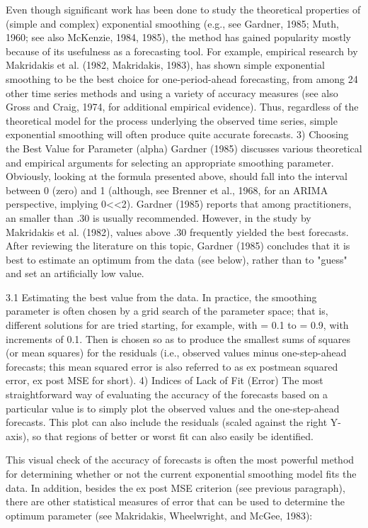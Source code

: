 Even though significant work has been done to study the theoretical properties of (simple and complex) exponential smoothing (e.g., see Gardner, 1985; Muth, 1960; see also McKenzie, 1984, 1985), the method has gained popularity mostly because of its usefulness as a forecasting tool. For example, empirical research by Makridakis et al. (1982, Makridakis, 1983), has shown simple exponential smoothing to be the best choice for one-period-ahead forecasting, from among 24 other time series methods and using a variety of accuracy measures (see also Gross and Craig, 1974, for additional empirical evidence). Thus, regardless of the theoretical model for the process underlying the observed time series, simple exponential smoothing will often produce quite accurate forecasts.
3) Choosing the Best Value for Parameter   (alpha)
Gardner (1985) discusses various theoretical and empirical arguments for selecting an appropriate smoothing parameter. Obviously, looking at the formula presented above,  should fall into the interval between 0 (zero) and 1 (although, see Brenner et al., 1968, for an ARIMA perspective, implying 0<<2). Gardner (1985) reports that among practitioners, an  smaller than .30 is usually recommended. However, in the study by Makridakis et al. (1982),  values above .30 frequently yielded the best forecasts. After reviewing the literature on this topic, Gardner (1985) concludes that it is best to estimate an optimum  from the data (see below), rather than to "guess" and set an artificially low value.

3.1 Estimating the best  value from the data. In practice, the smoothing parameter is often chosen by a grid search of the parameter space; that is, different solutions for  are tried starting, for example, with  = 0.1 to = 0.9, with increments of 0.1. Then  is chosen so as to produce the smallest sums of squares (or mean squares) for the residuals (i.e., observed values minus one-step-ahead forecasts; this mean squared error is also referred to as ex postmean squared error, ex post MSE for short).
4) Indices of Lack of Fit (Error)
The most straightforward way of evaluating the accuracy of the forecasts based on a particular  value is to simply plot the observed values and the one-step-ahead forecasts. This plot can also include the residuals (scaled against the right Y-axis), so that regions of better or worst fit can also easily be identified.

This visual check of the accuracy of forecasts is often the most powerful method for determining whether or not the current exponential smoothing model fits the data. In addition, besides the ex post MSE criterion (see previous paragraph), there are other statistical measures of error that can be used to determine the optimum  parameter (see Makridakis, Wheelwright, and McGee, 1983):

